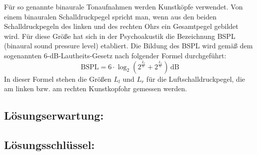 \begin{langesbeispiel}
\begin{aufgabenstellung}

\item Für so genannte binaurale Tonaufnahmen werden Kunstköpfe verwendet. Von einem binauralen Schalldruckpegel spricht man, wenn aus den beiden Schalldruckpegeln des linken und des rechten Ohrs ein Gesamtpegel gebildet wird. Für diese Größe hat sich in der Psychoakustik die Bezeichnung BSPL (binaural sound pressure level) etabliert. Die Bildung des BSPL wird gemäß dem sogenannten 6-dB-Lautheits-Gesetz nach folgender Formel durchgeführt:
	$$\text{BSPL}=6\cdot\log_2\left(2^\frac{L_l}{6}+2^\frac{L_r}{6}\right)\,\text{dB}$$
	In dieser Formel stehen die Größen $L_l$ und $L_r$ für die Luftschalldruckpegel, die am linken bzw. am rechten Kunstkopfohr gemessen werden.%


\end{aufgabenstellung}

\begin{loesung}
\item \subsection{Lösungserwartung:} 


\setcounter{subitemcounter}{0}
\subsection{Lösungsschlüssel:}
 

\end{loesung}
\end{langesbeispiel}
